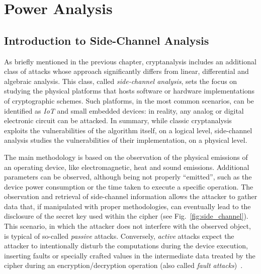 \chapter{Power Analysis}\label{chap:pow}

    \section{Introduction to Side-Channel Analysis}\label{sec:sca_intro}
        As briefly mentioned in the previous chapter, cryptanalysis includes an additional class of attacks whose approach significantly differs from linear, differential and algebraic analysis. This class, called \emph{side-channel analysis}, sets the focus on studying the physical platforms that hosts software or hardware implementations of cryptographic schemes. Such platforms, in the most common scenarios, can be identified as \emph{IoT} and small embedded devices: in reality, any analog or digital electronic circuit can be attacked. In summary, while classic cryptanalysis exploits the vulnerabilities of the algorithm itself, on a logical level, side-channel analysis studies the vulnerabilities of their implementation, on a physical level.
    
        The main methodology is based on the observation of the physical emissions of an operating device, like electromagnetic, heat and sound emissions. Additional parameters can be observed, although being not properly ``emitted'', such as the device power consumption or the time taken to execute a specific operation. The observation and retrieval of side-channel information allows the attacker to gather data that, if manipulated with proper methodologies, can eventually lead to the disclosure of the secret key used within the cipher (see Fig.~\ref{fig:side_channel}). This scenario, in which the attacker does not interfere with the observed object, is typical of so-called \emph{passive} attacks. Conversely, \emph{active} attacks expect the attacker to intentionally disturb the computations during the device execution, inserting faults or specially crafted values in the intermediate data treated by the cipher during an encryption/decryption operation (also called \emph{fault attacks})~\cite{sakiyama2016security}.
        
